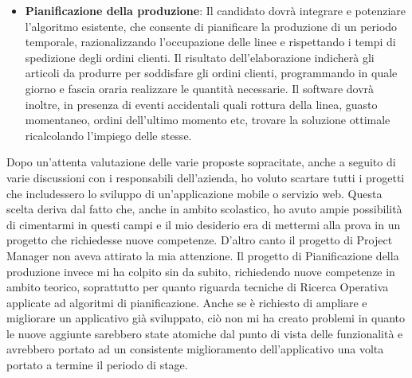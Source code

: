 \begin{itemize}
	\item \textbf{Pianificazione della produzione}: Il candidato dovrà integrare e potenziare l’algoritmo esistente, che consente di
	pianificare la produzione di un periodo temporale, razionalizzando l’occupazione delle
	linee e rispettando i tempi di spedizione degli ordini clienti.
	Il risultato dell’elaborazione indicherà gli articoli da produrre per soddisfare gli ordini
	clienti, programmando in quale giorno e fascia oraria realizzare le quantità necessarie. Il
	software dovrà inoltre, in presenza di eventi accidentali quali rottura della linea, guasto
	momentaneo, ordini dell’ultimo momento etc, trovare la soluzione ottimale
	ricalcolando l’impiego delle stesse.
	
	
\end{itemize}


Dopo un'attenta valutazione delle varie proposte sopracitate, anche a seguito di varie discussioni con i responsabili dell'azienda, ho voluto scartare tutti i progetti
che includessero lo sviluppo di un'applicazione mobile o servizio web. Questa scelta deriva dal fatto che, anche in ambito scolastico, ho avuto ampie possibilità di 
cimentarmi in questi campi e il mio desiderio era di mettermi alla prova in un progetto che richiedesse nuove competenze. D'altro canto il progetto di Project Manager
non aveva attirato la mia attenzione. Il progetto di Pianificazione della produzione invece mi ha colpito sin da subito, richiedendo nuove competenze in ambito teorico,
soprattutto per quanto riguarda tecniche di Ricerca Operativa applicate ad algoritmi di pianificazione. Anche se è richiesto di ampliare e migliorare un applicativo già 
sviluppato, ciò non mi ha creato problemi in quanto le nuove aggiunte sarebbero state atomiche dal punto di vista delle funzionalità e avrebbero portato ad un consistente
miglioramento dell'applicativo una volta portato a termine il periodo di stage.

\pagebreak

